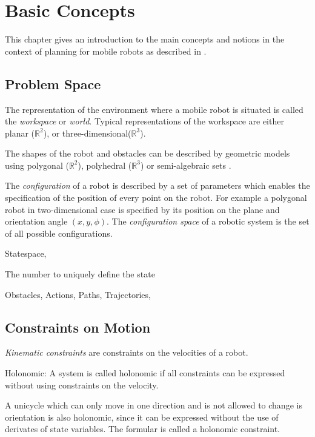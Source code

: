 \chapter{Basic Concepts}\label{ch:introductionplanning}
This chapter gives an introduction to the main concepts and notions in the context of planning for mobile robots as described in \cite{Choset_2005_5167}\cite{LaValle2006}.

\section{Problem Space}\label{sec:basic}
The representation of the environment where a mobile robot is situated is called the \emph{workspace} or \emph{world}.
Typical representations of the workspace are either planar ($\mathbb{R}^2$), or three-dimensional($\mathbb{R}^3$).

The shapes of the robot and obstacles can be described by geometric models using polygonal ($\mathbb{R}^2$), polyhedral ($\mathbb{R}^3$) or semi-algebraic sets \cite{LaValle2006}. 

The \emph{configuration} of a robot is described by a set of parameters which enables the specification of the position of every point on the robot. 
For example a polygonal robot in two-dimensional case is specified by its position on the plane and orientation angle $(x,y,\phi)$. 
The \emph{configuration space} of a robotic system is the set of all possible configurations. 

Statespace,

The number to uniquely define the state 

Obstacles,
Actions,
Paths,
Trajectories,

\section{Constraints on Motion}\label{sec:model}

\emph{Kinematic constraints} are constraints on the velocities of a robot. 


Holonomic:
A system is called holonomic if all constraints can be expressed without using constraints on the velocity. 

A unicycle which can only move in one direction and is not allowed to change is orientation is also holonomic, since  it can be expressed without the use of derivates of state variables.
The formular is called a holonomic constraint.

